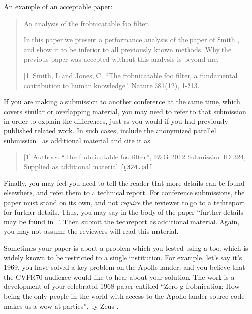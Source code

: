 \message{ !name(egpaper_for_review.tex)}\documentclass[10pt,twocolumn,letterpaper]{article}
\begin{document}
An example of an acceptable paper:

\begin{quote}
  \begin{center}
    An analysis of the frobnicatable foo filter.
  \end{center}

  In this paper we present a performance analysis of the paper of
  Smith \etal [1], and show it to be inferior to all previously known
  methods.  Why the previous paper was accepted without this analysis
  is beyond me.

  [1] Smith, L and Jones, C. ``The frobnicatable foo filter, a
  fundamental contribution to human knowledge''.  Nature 381(12),
  1-213.
\end{quote}

If you are making a submission to another conference at the same time,
which covers similar or overlapping material, you may need to refer to
that submission in order to explain the differences, just as you would
if you had previously published related work.  In such cases, include
the anonymized parallel submission~\cite{Authors12} as additional
material and cite it as
\begin{quote} [1] Authors. ``The frobnicatable foo filter'', F\&G 2012
  Submission ID 324, Supplied as additional material {\tt fg324.pdf}.
\end{quote}

Finally, you may feel you need to tell the reader that more details
can be found elsewhere, and refer them to a technical report.  For
conference submissions, the paper must stand on its own, and not {\em
  require} the reviewer to go to a techreport for further details.
Thus, you may say in the body of the paper ``further details may be
found in~\cite{Authors12b}''.  Then submit the techreport as
additional material.  Again, you may not assume the reviewers will
read this material.

Sometimes your paper is about a problem which you tested using a tool
which is widely known to be restricted to a single institution.  For
example, let's say it's 1969, you have solved a key problem on the
Apollo lander, and you believe that the CVPR70 audience would like to
hear about your solution.  The work is a development of your
celebrated 1968 paper entitled ``Zero-g frobnication: How being the
only people in the world with access to the Apollo lander source code
makes us a wow at parties'', by Zeus \etal.
\end{document}
